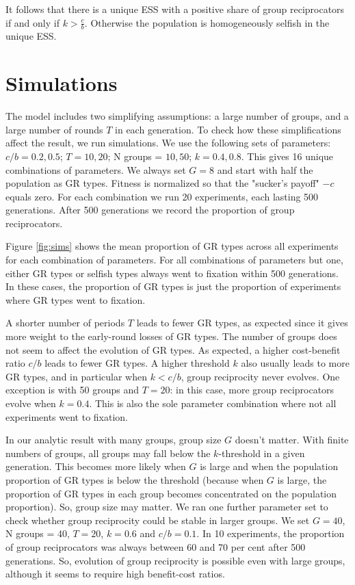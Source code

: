 \documentclass[12pt,a4paper]{article}
\begin{document}
It follows that there is a unique ESS with a positive share of group
reciprocators if and only if $k > \frac{c}{b}$. Otherwise the population is homogeneously selfish in the unique ESS.

\section{Simulations}

The model includes two simplifying assumptions: a large number of groups, and a large
number of rounds $T$ in each generation. To check how these simplifications affect
the result, we run simulations. We use the following sets of parameters:
$c/b = 0.2, 0.5$; $T = 10, 20$; N groups = $10, 50$; $k = 0.4, 0.8$. This gives
16 unique combinations of parameters. We always set $G = 8$ and start with
half the population as GR types. Fitness is normalized so that the "sucker's payoff"
$-c$ equals zero. For each combination we run 20 experiments, 
each lasting 500 generations. After 500 generations we record the proportion of 
group reciprocators. 

Figure \ref{fig:sims} shows the mean proportion of GR types across all experiments for
each combination of parameters. For all combinations of parameters but one,
either GR types or selfish types always went to fixation within 500 generations. In
these cases, the proportion of GR types is just the proportion of experiments
where GR types went to fixation.

A shorter number of periods $T$ leads to fewer 
GR types, as expected since it gives more weight to the early-round losses of GR 
types. The number of groups does not seem to affect the evolution of GR types. As
expected, a higher cost-benefit ratio $c/b$ leads to fewer GR types. A higher 
threshold $k$ also usually leads to more GR types, and in particular when 
$k < c/b$, group reciprocity never evolves. One exception is with 50 groups
and $T = 20$: in this case, more group reciprocators evolve when $k = 0.4$. 
This is also the sole parameter combination where not all experiments went to 
fixation.


In our analytic result with many groups, group size $G$ doesn't matter. 
With finite numbers of groups, all groups may fall below the $k$-threshold in a
given generation. This becomes more likely when $G$ is large and when the
population proportion of GR types is below the threshold (because when $G$ is
large, the proportion of GR types in each group becomes concentrated on
the population proportion). So, group size may matter. We ran one further 
parameter set to check whether group reciprocity could be
stable in larger groups. We set $G =  40$, N groups = 40, $T = 20$, $k = 0.6$ 
and $c/b = 0.1$. In 10 experiments, the proportion of group reciprocators was
always between 60 and 70 per cent after 500 generations. So, evolution of
group reciprocity is possible even with large groups, although it seems to 
require high benefit-cost ratios.
\end{document}
